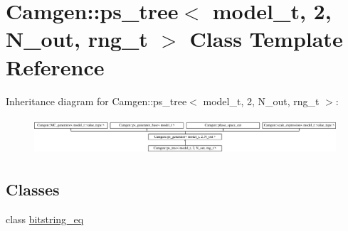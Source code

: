 \hypertarget{a00447}{\section{Camgen\-:\-:ps\-\_\-tree$<$ model\-\_\-t, 2, N\-\_\-out, rng\-\_\-t $>$ Class Template Reference}
\label{a00447}
}
Inheritance diagram for Camgen\-:\-:ps\-\_\-tree$<$ model\-\_\-t, 2, N\-\_\-out, rng\-\_\-t $>$\-:\begin{figure}[H]
\begin{center}
\leavevmode
\includegraphics[height=1.377049cm]{a00447}
\end{center}
\end{figure}
\subsection*{Classes}
\begin{DoxyCompactItemize}
\item 
class \hyperlink{a00031}{bitstring\-\_\-eq}
\end{DoxyCompactItemize}
